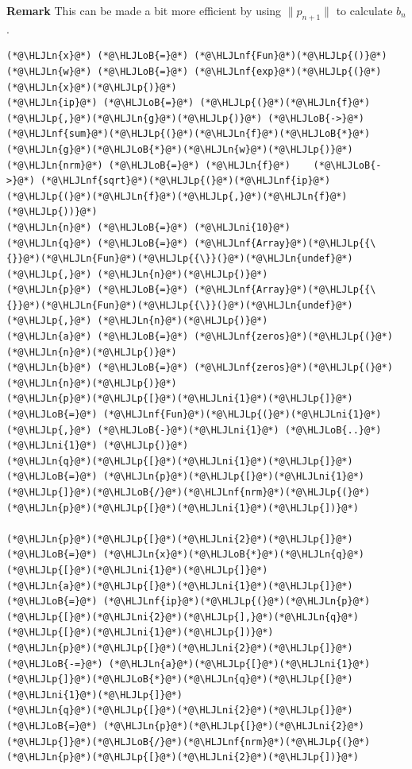 \documentclass[12pt,a4paper]{article}
\newcommand{\HLJLn}[1]{#1}
\newcommand{\HLJLnf}[1]{\textcolor[RGB]{66,102,213}{#1}}
\newcommand{\HLJLni}[1]{\textcolor[RGB]{59,151,46}{#1}}
\newcommand{\HLJLoB}[1]{\textcolor[RGB]{102,102,102}{\textbf{#1}}}
\newcommand{\HLJLp}[1]{#1}
\begin{document}
\textbf{Remark} This can be made a bit more efficient by using $\|p_{n+1}\|$ to calculate $b_n$.


\begin{lstlisting}
(*@\HLJLn{x}@*) (*@\HLJLoB{=}@*) (*@\HLJLnf{Fun}@*)(*@\HLJLp{()}@*)
(*@\HLJLn{w}@*) (*@\HLJLoB{=}@*) (*@\HLJLnf{exp}@*)(*@\HLJLp{(}@*)(*@\HLJLn{x}@*)(*@\HLJLp{)}@*)
(*@\HLJLn{ip}@*) (*@\HLJLoB{=}@*) (*@\HLJLp{(}@*)(*@\HLJLn{f}@*)(*@\HLJLp{,}@*)(*@\HLJLn{g}@*)(*@\HLJLp{)}@*) (*@\HLJLoB{->}@*) (*@\HLJLnf{sum}@*)(*@\HLJLp{(}@*)(*@\HLJLn{f}@*)(*@\HLJLoB{*}@*)(*@\HLJLn{g}@*)(*@\HLJLoB{*}@*)(*@\HLJLn{w}@*)(*@\HLJLp{)}@*)
(*@\HLJLn{nrm}@*) (*@\HLJLoB{=}@*) (*@\HLJLn{f}@*)    (*@\HLJLoB{->}@*) (*@\HLJLnf{sqrt}@*)(*@\HLJLp{(}@*)(*@\HLJLnf{ip}@*)(*@\HLJLp{(}@*)(*@\HLJLn{f}@*)(*@\HLJLp{,}@*)(*@\HLJLn{f}@*)(*@\HLJLp{))}@*)
(*@\HLJLn{n}@*) (*@\HLJLoB{=}@*) (*@\HLJLni{10}@*)
(*@\HLJLn{q}@*) (*@\HLJLoB{=}@*) (*@\HLJLnf{Array}@*)(*@\HLJLp{{\{}}@*)(*@\HLJLn{Fun}@*)(*@\HLJLp{{\}}(}@*)(*@\HLJLn{undef}@*)(*@\HLJLp{,}@*) (*@\HLJLn{n}@*)(*@\HLJLp{)}@*)
(*@\HLJLn{p}@*) (*@\HLJLoB{=}@*) (*@\HLJLnf{Array}@*)(*@\HLJLp{{\{}}@*)(*@\HLJLn{Fun}@*)(*@\HLJLp{{\}}(}@*)(*@\HLJLn{undef}@*)(*@\HLJLp{,}@*) (*@\HLJLn{n}@*)(*@\HLJLp{)}@*)
(*@\HLJLn{a}@*) (*@\HLJLoB{=}@*) (*@\HLJLnf{zeros}@*)(*@\HLJLp{(}@*)(*@\HLJLn{n}@*)(*@\HLJLp{)}@*)
(*@\HLJLn{b}@*) (*@\HLJLoB{=}@*) (*@\HLJLnf{zeros}@*)(*@\HLJLp{(}@*)(*@\HLJLn{n}@*)(*@\HLJLp{)}@*)
(*@\HLJLn{p}@*)(*@\HLJLp{[}@*)(*@\HLJLni{1}@*)(*@\HLJLp{]}@*) (*@\HLJLoB{=}@*) (*@\HLJLnf{Fun}@*)(*@\HLJLp{(}@*)(*@\HLJLni{1}@*)(*@\HLJLp{,}@*) (*@\HLJLoB{-}@*)(*@\HLJLni{1}@*) (*@\HLJLoB{..}@*) (*@\HLJLni{1}@*) (*@\HLJLp{)}@*)
(*@\HLJLn{q}@*)(*@\HLJLp{[}@*)(*@\HLJLni{1}@*)(*@\HLJLp{]}@*) (*@\HLJLoB{=}@*) (*@\HLJLn{p}@*)(*@\HLJLp{[}@*)(*@\HLJLni{1}@*)(*@\HLJLp{]}@*)(*@\HLJLoB{/}@*)(*@\HLJLnf{nrm}@*)(*@\HLJLp{(}@*)(*@\HLJLn{p}@*)(*@\HLJLp{[}@*)(*@\HLJLni{1}@*)(*@\HLJLp{])}@*)

(*@\HLJLn{p}@*)(*@\HLJLp{[}@*)(*@\HLJLni{2}@*)(*@\HLJLp{]}@*) (*@\HLJLoB{=}@*) (*@\HLJLn{x}@*)(*@\HLJLoB{*}@*)(*@\HLJLn{q}@*)(*@\HLJLp{[}@*)(*@\HLJLni{1}@*)(*@\HLJLp{]}@*)
(*@\HLJLn{a}@*)(*@\HLJLp{[}@*)(*@\HLJLni{1}@*)(*@\HLJLp{]}@*) (*@\HLJLoB{=}@*) (*@\HLJLnf{ip}@*)(*@\HLJLp{(}@*)(*@\HLJLn{p}@*)(*@\HLJLp{[}@*)(*@\HLJLni{2}@*)(*@\HLJLp{],}@*)(*@\HLJLn{q}@*)(*@\HLJLp{[}@*)(*@\HLJLni{1}@*)(*@\HLJLp{])}@*)
(*@\HLJLn{p}@*)(*@\HLJLp{[}@*)(*@\HLJLni{2}@*)(*@\HLJLp{]}@*) (*@\HLJLoB{-=}@*) (*@\HLJLn{a}@*)(*@\HLJLp{[}@*)(*@\HLJLni{1}@*)(*@\HLJLp{]}@*)(*@\HLJLoB{*}@*)(*@\HLJLn{q}@*)(*@\HLJLp{[}@*)(*@\HLJLni{1}@*)(*@\HLJLp{]}@*)
(*@\HLJLn{q}@*)(*@\HLJLp{[}@*)(*@\HLJLni{2}@*)(*@\HLJLp{]}@*) (*@\HLJLoB{=}@*) (*@\HLJLn{p}@*)(*@\HLJLp{[}@*)(*@\HLJLni{2}@*)(*@\HLJLp{]}@*)(*@\HLJLoB{/}@*)(*@\HLJLnf{nrm}@*)(*@\HLJLp{(}@*)(*@\HLJLn{p}@*)(*@\HLJLp{[}@*)(*@\HLJLni{2}@*)(*@\HLJLp{])}@*)


\end{lstlisting}
\end{document}
